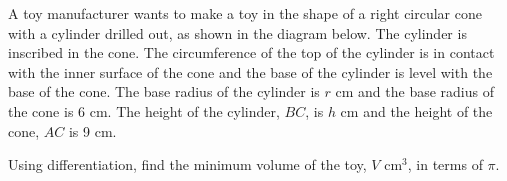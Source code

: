 \documentclass{echw}
\begin{document}
    \problem{}
        A toy manufacturer wants to make a toy in the shape of a right circular cone with a cylinder drilled out, as shown in the diagram below. The cylinder is inscribed in the cone. The circumference of the top of the cylinder is in contact with the inner surface of the cone and the base of the cylinder is level with the base of the cone. The base radius of the cylinder is $r$ cm and the base radius of the cone is 6 cm. The height of the cylinder, $BC$, is $h$ cm and the height of the cone, $AC$ is 9 cm.

        \begin{center}
        \end{center}

        Using differentiation, find the minimum volume of the toy, $V$ cm$^3$, in terms of $\pi$.
\end{document}
